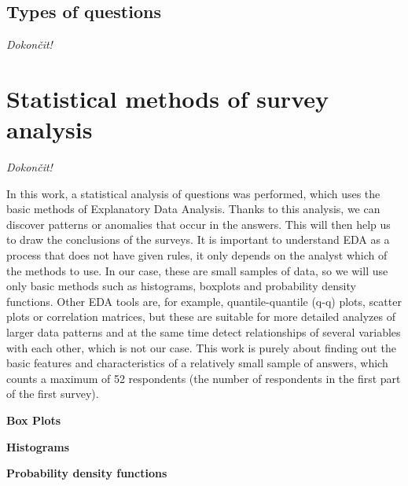 \documentclass[a4paper,10pt,twoside]{article}
\begin{document}
\newpage
\vspace*{-1cm}
\subsection{Types of questions}

\noindent \textit{\color{red}Dokončit!}

\newpage
\vspace*{-1cm}
\section{Statistical methods of survey analysis}
\label{sec:qstat}

\noindent \textit{\color{red}Dokončit!}

In this work, a statistical analysis of questions was performed, which uses the basic methods of Explanatory Data Analysis. Thanks to this analysis, we can discover patterns or anomalies that occur in the answers. This will then help us to draw the conclusions of the surveys. It is important to understand EDA as a process that does not have given rules, it only depends on the analyst which of the methods to use. In our case, these are small samples of data, so we will use only basic methods such as histograms, boxplots and probability density functions. Other EDA tools are, for example, quantile-quantile (q-q) plots, scatter plots or correlation matrices, but these are suitable for more detailed analyzes of larger data patterns and at the same time detect relationships of several variables with each other, which is not our case. This work is purely about finding out the basic features and characteristics of a relatively small sample of answers, which counts a maximum of 52 respondents (the number of respondents in the first part of the first survey).

\noindent \textbf {Box Plots}
\smallskip

\noindent \textbf {Histograms}
\smallskip

\noindent \textbf {Probability density functions}
\smallskip



\newpage
\vspace*{-1cm}
\end{document}
